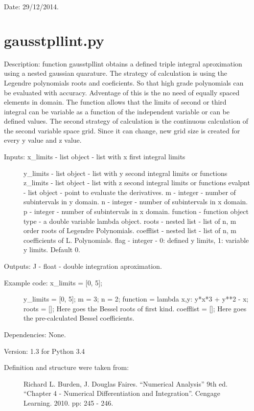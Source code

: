 \documentclass[letterpaper,10pt,oneside]{sphinxmanual}
\theoremstyle{plain}%
\theoremstyle{definition}%
\theoremstyle{remark}%
\begin{document}
Date: 29/12/2014.


\section{gausstpllint.py}
\label{code:module-gausstpllint}\label{code:gausstpllint-py}
Description: function gausstpllint obtains a defined triple integral 
aproximation using a nested gaussian quarature. The strategy of calculation
is using the Legendre polynomials roots and coeficients. So that high grade 
polynomials can be evaluated with accuracy. Adventage of this is the no need
of equally spaced elements in domain. The function allows that the limits of 
second or third integral can be variable as a function of the independent 
variable or can be defined values. The second strategy of calculation is 
the continuous calculation of the second variable space grid. Since it can 
change, new grid size is created for every y value and z value.
\begin{description}
\item[{Inputs: x\_limits - list object - list with x first integral limits}] \leavevmode
y\_limits - list object - list with y second integral limits or functions
z\_limits - list object - list with z second integral limits or functions
evalpnt - list object - point to evaluate the derivatives.
m - integer - number of subintervals in y domain.
n - integer - number of subintervals in x domain.
p - integer - number of subintervals in x domain.
function - function object type - a double variable lambda object.
roots - nested list - list of n, m order roots of Legendre Polynomials.
coefflist - nested list - list of n, m coefficients of L. Polynomials.
flag - integer - 0: defined y limits, 1: variable y limits. Default 0.

\end{description}

Outputs: J - float - double integration aproximation.
\begin{description}
\item[{Example code: x\_limits = {[}0, 5{]};}] \leavevmode
y\_limits = {[}0, 5{]};
m = 3;
n = 2;
function = lambda x,y: y*x*3 + y**2 - x;
roots = {[}{]}; Here goes the Bessel roots of first kind.
coefflist = {[}{]}; Here goes the pre-calculated Bessel coefficients.

\end{description}

Dependencies: None.

Version: 1.3 for Python 3.4
\begin{description}
\item[{Definition and structure were taken from:}] \leavevmode
Richard L. Burden, J. Douglas Faires. ``Numerical Analysis'' 9th ed.
``Chapter 4 - Numerical Differentiation and Integration''. 
Cengage Learning. 2010. pp: 245 - 246.

\end{description}
\end{document}

